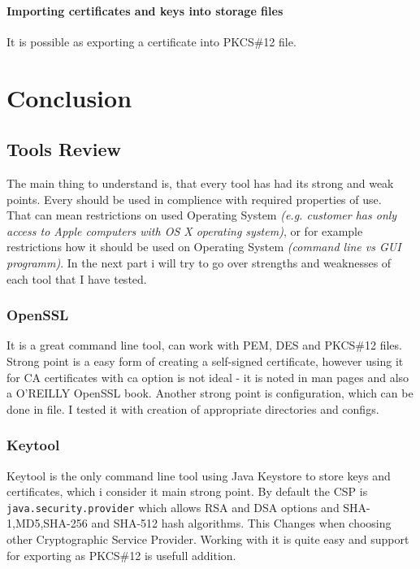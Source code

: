 \documentclass[10pt, a4paper]{report}
\begin{document}
  \subsection{Importing certificates and keys into storage files}
It is possible as exporting a certificate into PKCS\#12 file.
  
\part{Conclusion}

\chapter{Tools Review}

The main thing to understand is, that every tool has had its strong and weak points. Every should be used in complience with required properties of use.\\ 

That can mean restrictions on used Operating System \textit{(e.g. customer has only access to Apple computers with OS X operating system)}, or for example restrictions how it should be used on Operating System \textit{(command line vs GUI programm)}. In the next part i will try to go over strengths and weaknesses of each tool that I have tested.

\section{OpenSSL}
It is a great command line tool, can work with PEM, DES and PKCS\#12 files. Strong point is a easy form of creating a self-signed certificate, however using it for CA certificates with ca option is not ideal - it is noted in man pages and also a O'REILLY OpenSSL book.
Another strong point is configuration, which can be done in file. I tested it with creation of appropriate directories and configs.

\section{Keytool}
Keytool is the only command line tool using Java Keystore to store keys and certificates, which i consider it main strong point. By default the CSP is \verb+java.security.provider+ which allows RSA and DSA options and SHA-1,MD5,SHA-256 and SHA-512 hash algorithms. This Changes when choosing other Cryptographic Service Provider. Working with it is quite easy and support for exporting as PKCS\#12 is usefull addition.
\end{document}
